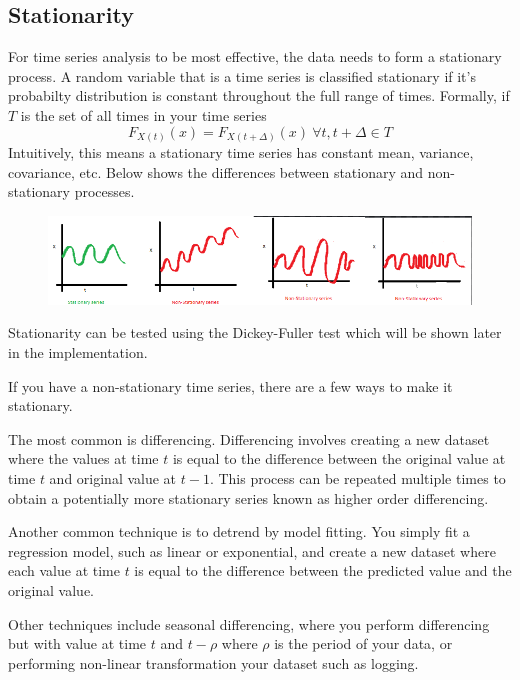 \documentclass{article}
\begin{document}
  \subsection{Stationarity}
  For time series analysis to be most effective, the data needs to form a stationary process. 
  A random variable that is a time series is classified stationary if it's probabilty distribution is constant throughout the full range of times. 
  Formally, if $T$ is the set of all times in your time series
  \begin{equation*}
    F_{X(t)}(x) = F_{X(t+\Delta)}(x)\ \forall t, t+\Delta \in T
  \end{equation*}
  Intuitively, this means a stationary time series has constant mean, variance, covariance, etc. Below shows the differences between stationary and non-stationary processes.
  \begin{figure}[H]
    \includegraphics[width=\linewidth]{stationary_time_series.png}
  \end{figure}
  \begin{flushleft}
    Stationarity can be tested using the Dickey-Fuller test which will be shown later in the implementation.

    If you have a non-stationary time series, there are a few ways to make it stationary. 
    
    The most common is differencing. Differencing involves creating a new dataset where the values at time $t$ is equal to the difference between the original value at time $t$ and original value at $t-1$. This process can be repeated multiple times to obtain a potentially more stationary series known as higher order differencing.

    Another common technique is to detrend by model fitting. You simply fit a regression model, such as linear or exponential, and create a new dataset where each value at time $t$ is equal to the difference between the predicted value and the original value.

    Other techniques include seasonal differencing, where you perform differencing but with value at time $t$ and $t-\rho$ where $\rho$ is the period of your data, or performing non-linear transformation your dataset such as logging.
  \end{flushleft}
  \newpage
\end{document}
